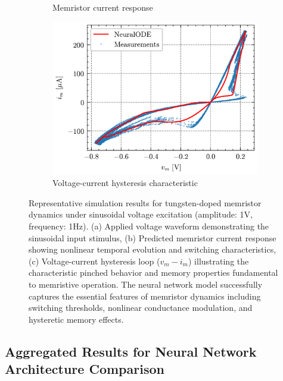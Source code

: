 \documentclass[11pt, oneside]{article}
\begin{document}
\begin{figure}[H]
\begin{subfigure}[b]{\subwidth}
        \caption{Memristor current response}
    \end{subfigure}
    \begin{subfigure}[b]{\subwidth}
        \includegraphics[width=\linewidth]{sample_results/hysteresis.png}
        \caption{Voltage-current hysteresis characteristic}
    \end{subfigure}
    \caption{Representative simulation results for tungsten-doped memristor dynamics under sinusoidal voltage excitation (amplitude: 1V, frequency: 1Hz). (a) Applied voltage waveform demonstrating the sinusoidal input stimulus, (b) Predicted memristor current response showing nonlinear temporal evolution and switching characteristics, (c) Voltage-current hysteresis loop ($v_m - i_m$) illustrating the characteristic pinched behavior and memory properties fundamental to memristive operation. The neural network model successfully captures the essential features of memristor dynamics including switching thresholds, nonlinear conductance modulation, and hysteretic memory effects.}
    \label{fig:sample-results}
\end{figure}


\subsection{Aggregated Results for Neural Network Architecture Comparison}
\end{document}

